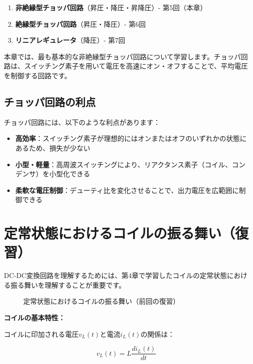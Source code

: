 \begin{enumerate}
\item \textbf{非絶縁型チョッパ回路}（昇圧・降圧・昇降圧）- 第5回（本章）
\item \textbf{絶縁型チョッパ回路}（昇圧・降圧）- 第6回
\item \textbf{リニアレギュレータ}（降圧）- 第7回
\end{enumerate}

本章では、最も基本的な非絶縁型チョッパ回路について学習します。チョッパ回路は、スイッチング素子を用いて電圧を高速にオン・オフすることで、平均電圧を制御する回路です。

\subsection{チョッパ回路の利点}

チョッパ回路には、以下のような利点があります：

\begin{itemize}
\item \textbf{高効率}：スイッチング素子が理想的にはオンまたはオフのいずれかの状態にあるため、損失が少ない
\item \textbf{小型・軽量}：高周波スイッチングにより、リアクタンス素子（コイル、コンデンサ）を小型化できる
\item \textbf{柔軟な電圧制御}：デューティ比を変化させることで、出力電圧を広範囲に制御できる
\end{itemize}

\section{定常状態におけるコイルの振る舞い（復習）}

DC-DC変換回路を理解するためには、第4章で学習したコイルの定常状態における振る舞いを理解することが重要です。

\begin{figure}[H]
\centering
{}
\caption{定常状態におけるコイルの振る舞い（前回の復習）}
\label{fig:ch05_inductor_review}
\end{figure}

\textbf{コイルの基本特性：}

コイルに印加される電圧$v_L(t)$と電流$i_L(t)$の関係は：

\begin{equation}
v_L(t) = L \frac{di_L(t)}{dt}
\end{equation}

